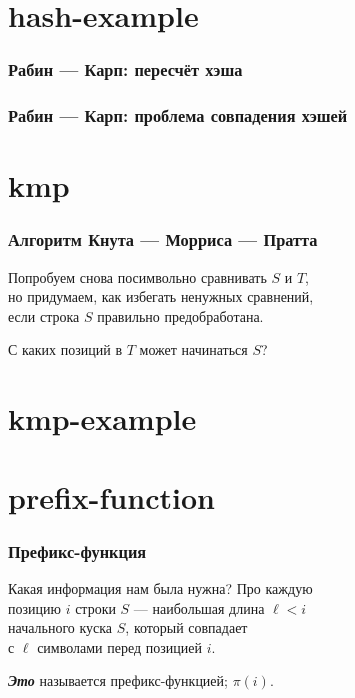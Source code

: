 \documentclass[11pt,aspectratio=169,svgnames]{beamer}
\begin{document}
\section{hash-example}

\begin{frame} \frametitle{Рабин — Карп: пересчёт хэша}
  \begin{center} \begin{tikzpicture}[xscale=0.71,yscale=0.87]
    
  \end{tikzpicture} \end{center}
\end{frame}


\begin{frame} \frametitle{Рабин — Карп: проблема совпадения хэшей}
  \begin{center} \begin{tikzpicture}[xscale=0.71,yscale=0.87]
    
  \end{tikzpicture} \end{center}
\end{frame}


\section{kmp}

\begin{frame} \frametitle{Алгоритм Кнута — Морриса — Пратта}
Попробуем снова посимвольно сравнивать \(S\) и \(T\),\\
но придумаем, как избегать ненужных сравнений,\\
если строка \(S\) правильно предобработана.\bigskip \pause

С каких позиций в \(T\) может начинаться \(S\)?
\end{frame}


\section{kmp-example}




\section{prefix-function}

\begin{frame} \frametitle{Префикс-функция}
Какая информация нам была нужна? Про каждую\\
позицию \(i\) строки \(S\) — наибольшая длина \(\ell< i\)\\
начального куска \(S\), который совпадает\\
с \(\ell\) символами перед позицией \(i\). \bigskip

{\itshape\bfseries Это} называется префикс-функцией; \(π(i)\). \bigskip


\end{frame}
\end{document}
